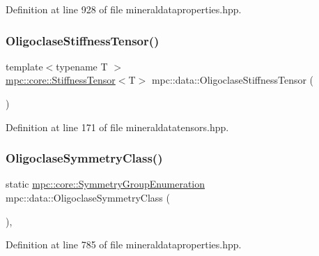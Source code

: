 Definition at line 928 of file mineraldataproperties.\+hpp.

\mbox{\label{namespacempc_1_1data_ac95f3f5f1edca76889006993ef8da74b}} 
\subsubsection{\texorpdfstring{Oligoclase\+Stiffness\+Tensor()}{OligoclaseStiffnessTensor()}}
{\footnotesize\ttfamily template$<$typename T $>$ \\
\mbox{\hyperlink{structmpc_1_1core_1_1_stiffness_tensor}{mpc\+::core\+::\+Stiffness\+Tensor}}$<$T$>$ mpc\+::data\+::\+Oligoclase\+Stiffness\+Tensor (\begin{DoxyParamCaption}{ }\end{DoxyParamCaption})}



Definition at line 171 of file mineraldatatensors.\+hpp.

\mbox{\label{namespacempc_1_1data_a9fc60081a5638a22ddb9ad2b2aad862b}} 
\subsubsection{\texorpdfstring{Oligoclase\+Symmetry\+Class()}{OligoclaseSymmetryClass()}}
{\footnotesize\ttfamily static \mbox{\hyperlink{namespacempc_1_1core_a9d979684062547055a0ef5c13077bad8}{mpc\+::core\+::\+Symmetry\+Group\+Enumeration}} mpc\+::data\+::\+Oligoclase\+Symmetry\+Class (\begin{DoxyParamCaption}{ }\end{DoxyParamCaption})\hspace{0.3cm}{\ttfamily [inline]}, {\ttfamily [static]}}



Definition at line 785 of file mineraldataproperties.\+hpp.

\mbox{\label{namespacempc_1_1data_aa30e6d0800f762cbed907f0b39a117b8}} 
